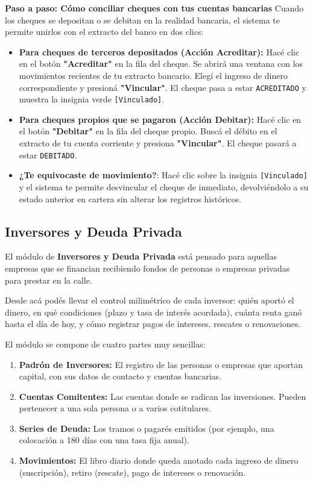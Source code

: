 \documentclass[12pt,a4paper]{article}
\renewcommand{\_}{\textunderscore\allowbreak}
\begin{document}
\textbf{Paso a paso: Cómo conciliar cheques con tus cuentas bancarias}
Cuando los cheques se depositan o se debitan en la realidad bancaria, el sistema te permite unirlos con el extracto del banco en dos clics:
\begin{itemize}
    \item \textbf{Para cheques de terceros depositados (Acción Acreditar):} Hacé clic en el botón \textbf{"Acreditar"} en la fila del cheque. Se abrirá una ventana con los movimientos recientes de tu extracto bancario. Elegí el ingreso de dinero correspondiente y presioná \textbf{"Vincular"}. El cheque pasa a estar \texttt{ACREDITADO} y muestra la insignia verde \texttt{[Vinculado]}.
    \item \textbf{Para cheques propios que se pagaron (Acción Debitar):} Hacé clic en el botón \textbf{"Debitar"} en la fila del cheque propio. Buscá el débito en el extracto de tu cuenta corriente y presiona \textbf{"Vincular"}. El cheque pasará a estar \texttt{DEBITADO}.
    \item \textbf{¿Te equivocaste de movimiento?}: Hacé clic sobre la insignia \texttt{[Vinculado]} y el sistema te permite desvincular el cheque de inmediato, devolviéndolo a su estado anterior en cartera sin alterar los registros históricos.
\end{itemize}

\subsection{Inversores y Deuda Privada}

El módulo de \textbf{Inversores y Deuda Privada} está pensado para aquellas empresas que se financian recibiendo fondos de personas o empresas privadas para prestar en la calle. 

Desde acá podés llevar el control milimétrico de cada inversor: quién aportó el dinero, en qué condiciones (plazo y tasa de interés acordada), cuánta renta ganó hasta el día de hoy, y cómo registrar pagos de intereses, rescates o renovaciones.

El módulo se compone de cuatro partes muy sencillas:
\begin{enumerate}
    \item \textbf{Padrón de Inversores:} El registro de las personas o empresas que aportan capital, con sus datos de contacto y cuentas bancarias.
    \item \textbf{Cuentas Comitentes:} Las cuentas donde se radican las inversiones. Pueden pertenecer a una sola persona o a varios cotitulares.
    \item \textbf{Series de Deuda:} Los tramos o pagarés emitidos (por ejemplo, una colocación a 180 días con una tasa fija anual).
    \item \textbf{Movimientos:} El libro diario donde queda anotado cada ingreso de dinero (suscripción), retiro (rescate), pago de intereses o renovación.
\end{enumerate}
\end{document}

